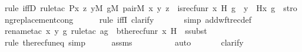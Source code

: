 \begin{isabellebody}
{\isacharparenleft}{\kern0pt}rule\ iffD{}{\isacharcomma}{\kern0pt}\ rule{\isacharunderscore}{\kern0pt}tac\ P{\isacharequal}{\kern0pt}{\isachardoublequoteopen}{\isasymlambda}x\ z{\isachardot}{\kern0pt}\ {\isasymexists}y{\isacharbrackleft}{\kern0pt}{\isacharhash}{\kern0pt}{\isacharhash}{\kern0pt}M{\isacharbrackright}{\kern0pt}{\isachardot}{\kern0pt}\ {\isasymexists}g{\isacharbrackleft}{\kern0pt}{\isacharhash}{\kern0pt}{\isacharhash}{\kern0pt}M{\isacharbrackright}{\kern0pt}{\isachardot}{\kern0pt}\ pair{\isacharparenleft}{\kern0pt}{\isacharhash}{\kern0pt}{\isacharhash}{\kern0pt}M{\isacharcomma}{\kern0pt}\ x{\isacharcomma}{\kern0pt}\ y{\isacharcomma}{\kern0pt}\ z{\isacharparenright}{\kern0pt}\ {\isasymand}\ is{\isacharunderscore}{\kern0pt}recfun{\isacharparenleft}{\kern0pt}r{\isacharcomma}{\kern0pt}\ x{\isacharcomma}{\kern0pt}\ H{\isacharcomma}{\kern0pt}\ g{\isacharparenright}{\kern0pt}\ {\isasymand}\ y\ {\isacharequal}{\kern0pt}\ H{\isacharparenleft}{\kern0pt}x{\isacharcomma}{\kern0pt}\ g{\isacharparenright}{\kern0pt}{\isachardoublequoteclose}\ \ strong{\isacharunderscore}{\kern0pt}replacement{\isacharunderscore}{\kern0pt}cong{\isacharparenright}{\kern0pt}\isanewline
\ \ \ \ \ \isamarkupfalse%
{\isacharparenleft}{\kern0pt}rule\ iffI{\isacharcomma}{\kern0pt}\ clarify{\isacharparenright}{\kern0pt}\isanewline
\ \ \ \ \ \ \isamarkupfalse%
{\isacharparenleft}{\kern0pt}simp\ add{\isacharcolon}{\kern0pt}wftrec{\isacharunderscore}{\kern0pt}def{\isacharparenright}{\kern0pt}\isanewline
\ \ \ \ \ \ \isamarkupfalse%
{\isacharparenleft}{\kern0pt}rename{\isacharunderscore}{\kern0pt}tac\ x\ y\ g{\isacharcomma}{\kern0pt}\ rule{\isacharunderscore}{\kern0pt}tac\ a{\isacharequal}{\kern0pt}g\ \ b{\isacharequal}{\kern0pt}{\isachardoublequoteopen}the{\isacharunderscore}{\kern0pt}recfun{\isacharparenleft}{\kern0pt}r{\isacharcomma}{\kern0pt}\ x{\isacharcomma}{\kern0pt}\ H{\isacharparenright}{\kern0pt}{\isachardoublequoteclose}\ \ ssubst{\isacharparenright}{\kern0pt}\isanewline
\ \ \ \ \ \ \ \isamarkupfalse%
{\isacharparenleft}{\kern0pt}rule\ the{\isacharunderscore}{\kern0pt}recfun{\isacharunderscore}{\kern0pt}eq{\isacharcomma}{\kern0pt}\ simp{\isacharparenright}{\kern0pt}\isanewline
\ \ \ \ \isamarkupfalse%
\ assms\isanewline
\ \ \ \ \ \ \ \ \isamarkupfalse%
\ auto{\isacharbrackleft}{\kern0pt}{}{\isacharbrackright}{\kern0pt}\isanewline
\ \ \ \ \ \isamarkupfalse%
\ clarify\isanewline
\ \ \ \ \ \isamarkupfalse%

\end{isabellebody}
